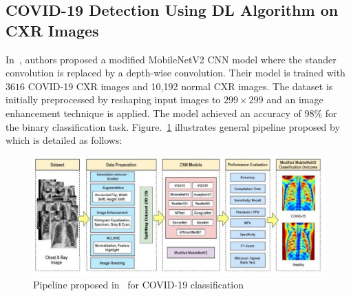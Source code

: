   
\subsection{COVID-19 Detection Using DL Algorithm on CXR Images}

In~\cite{akt}, authors proposed a modified MobileNetV2 CNN model where the stander convolution is replaced by a depth-wise convolution. Their model is trained with $3616$ COVID-19 CXR images and 10,192 normal CXR images. The dataset is initially preprocessed by reshaping input images to $299\times299$ and an image enhancement technique is applied. The model achieved an accuracy of 98\% for the binary classification task. Figure.~\ref{fig:akterPipeline} illustrates general pipeline proposed by~\cite{akt} which is detailed as follows:

\begin{figure}
    \begin{center}
        \includegraphics[width=\textwidth]{Figures/AkterPipeline.png}
        \caption{\label{fig:akterPipeline} Pipeline proposed in~\cite{akt} for COVID-19 classification}
    \end{center}
\end{figure}

